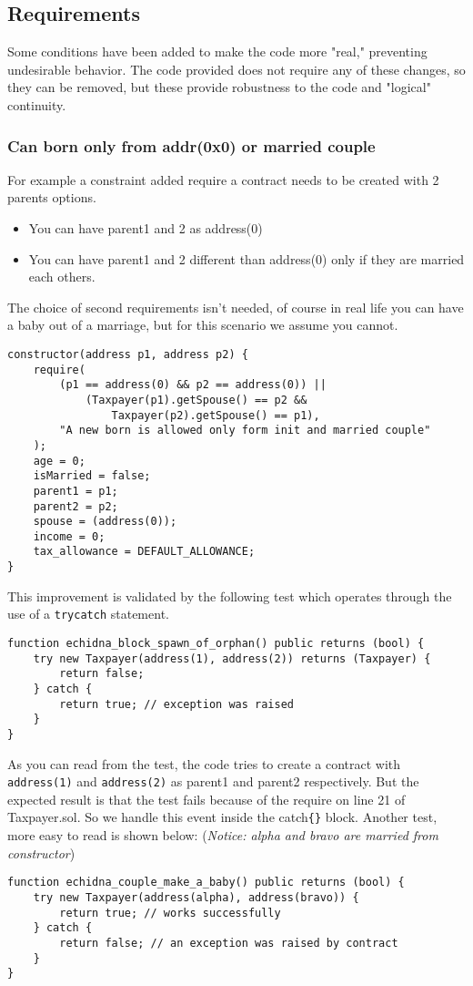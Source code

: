 \documentclass{article}
\begin{document}
\subsection{Requirements}
Some conditions have been added to make the code more "real," preventing undesirable behavior. The code provided does not require any of these changes, so they can be removed, but these provide robustness to the code and "logical" continuity.
\subsubsection{Can born only from addr(0x0) or married couple}
For example a constraint added require a contract needs to be created with 2 parents options.
\begin{itemize}
    \small
    \item You can have parent1 and 2 as address(0)
    \item You can have parent1 and 2 different than address(0) only if they are married each others.
\end{itemize}
The choice of second requirements isn't needed, of course in real life you can have a baby out of a marriage, but for this scenario we assume you cannot.
\begin{verbatim}
constructor(address p1, address p2) {
    require(
        (p1 == address(0) && p2 == address(0)) ||
            (Taxpayer(p1).getSpouse() == p2 &&
                Taxpayer(p2).getSpouse() == p1),
        "A new born is allowed only form init and married couple"
    );
    age = 0;
    isMarried = false;
    parent1 = p1;
    parent2 = p2;
    spouse = (address(0));
    income = 0;
    tax_allowance = DEFAULT_ALLOWANCE;
}
\end{verbatim}
This improvement is validated by the following test which operates through the use of a \texttt{try{}catch{}} statement.
\begin{verbatim}
function echidna_block_spawn_of_orphan() public returns (bool) {
    try new Taxpayer(address(1), address(2)) returns (Taxpayer) {
        return false;
    } catch {
        return true; // exception was raised
    }
}
\end{verbatim}
As you can read from the test, the code tries to create a contract with \texttt{address(1)} and \texttt{address(2)} as parent1 and parent2 respectively. But the expected result is that the test fails because of the require on line 21 of Taxpayer.sol. So we handle this event inside the catch\verb|{}| block.
Another test, more easy to read is shown below: (\textit{Notice: alpha and bravo are married from constructor})
\begin{verbatim}
function echidna_couple_make_a_baby() public returns (bool) {
    try new Taxpayer(address(alpha), address(bravo)) {
        return true; // works successfully
    } catch {
        return false; // an exception was raised by contract
    }
}
\end{verbatim}
\end{document}
